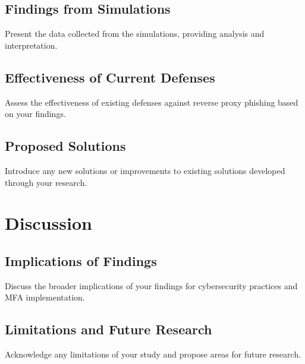 \documentclass[12pt]{report}
\begin{document}
\section{Findings from Simulations}
Present the data collected from the simulations, providing analysis and interpretation.

\section{Effectiveness of Current Defenses}
Assess the effectiveness of existing defenses against reverse proxy phishing based
on your findings.

\section{Proposed Solutions}
Introduce any new solutions or improvements to existing solutions developed through
your research.

\chapter{Discussion}
\section{Implications of Findings}
Discuss the broader implications of your findings for cybersecurity practices and
MFA implementation.

\section{Limitations and Future Research}
Acknowledge any limitations of your study and propose areas for future research.

\newpage


\end{document}
